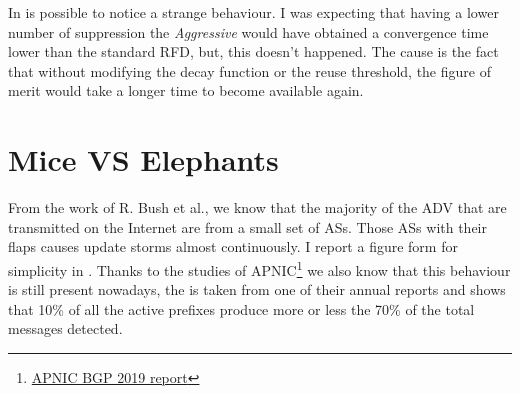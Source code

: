 In  is possible to notice a strange behaviour.
I was expecting that having a lower number of suppression the \textit{Aggressive}
would have obtained a convergence time lower than the standard \ac{RFD}, but,
this doesn't happened.
The cause is the fact that without modifying the decay function or the reuse
threshold, the figure of merit would take a longer time to become available again.

\section{Mice VS Elephants}
\label{sec:rfd_mice_vs_elephants}


From the work of R. Bush et al., \cite{pelsser2011route} we know that the majority
of the \ac{ADV} that are transmitted on the Internet are from a small set of \acp{AS}.
Those \acp{AS} with their flaps causes update storms almost continuously.
I report a figure form \cite{pelsser2011route} for simplicity in
.
Thanks to the studies of
\ac{APNIC}\footnote{\href{https://blog.apnic.net/2020/01/15/bgp-in-2019-bgp-churn/}{APNIC BGP 2019 report}}
we also know that this behaviour is still present nowadays, the 
is taken from one of their annual reports and shows that \num{10}\% of
all the active prefixes produce more or less the \num{70}\% of the total
messages detected.

